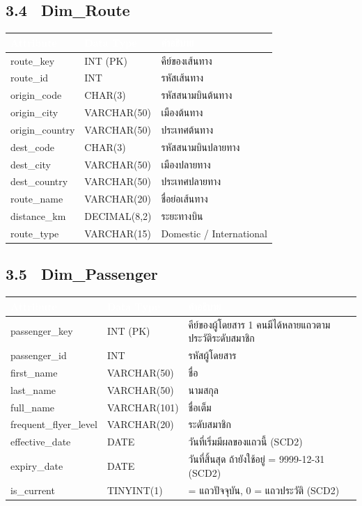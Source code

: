 \documentclass[11pt]{article}
\makeatletter
\newcommand{\atthead}{\rowcolor{tblHead}
  \textcolor{white}{\textbf{Attribute}} & \textcolor{white}{\textbf{Data Type}} & \textcolor{white}{\textbf{คำอธิบาย}}\\}
\newenvironment{atttable}[1]%
  {\subsection*{#1}\vspace{-4pt}
   \begin{tabular}{@{}>{\ttfamily\small}p{4.3cm} >{\small}p{2.7cm} >{\small\raggedright\arraybackslash}p{9.4cm}@{}}
   \toprule\atthead \midrule}%
  {\bottomrule\end{tabular}\vspace{3pt}}
\makeatother
\begin{document}
\begin{atttable}{3.4 \ Dim_Route }
route_key      & INT (PK)     & คีย์ของเส้นทาง\\
route_id       & INT          & รหัสเส้นทาง\\
origin_code    & CHAR(3)      & รหัสสนามบินต้นทาง\\
origin_city    & VARCHAR(50)  & เมืองต้นทาง\\
origin_country & VARCHAR(50)  & ประเทศต้นทาง\\
dest_code      & CHAR(3)      & รหัสสนามบินปลายทาง\\
dest_city      & VARCHAR(50)  & เมืองปลายทาง\\
dest_country   & VARCHAR(50)  & ประเทศปลายทาง\\
route_name     & VARCHAR(20)  & ชื่อย่อเส้นทาง\\
distance_km    & DECIMAL(8,2) & ระยะทางบิน \\
route_type     & VARCHAR(15)  & Domestic / International\\
\end{atttable}

\clearpage
\begin{atttable}{3.5 \ Dim_Passenger }
passenger_key        & INT (PK)     & คีย์ของผู้โดยสาร 1 คนมีได้หลายแถวตามประวัติระดับสมาชิก\\
passenger_id         & INT          & รหัสผู้โดยสาร\\
first_name           & VARCHAR(50)  & ชื่อ\\
last_name            & VARCHAR(50)  & นามสกุล\\
full_name            & VARCHAR(101) & ชื่อเต็ม\\
frequent_flyer_level & VARCHAR(20)  & ระดับสมาชิก\\
effective_date       & DATE         & วันที่เริ่มมีผลของแถวนี้ (SCD2)\\
expiry_date          & DATE         & วันที่สิ้นสุด ถ้ายังใช้อยู่ = 9999-12-31 (SCD2)\\
is_current           & TINYINT(1)   & 1 = แถวปัจจุบัน, 0 = แถวประวัติ (SCD2)\\
\end{atttable}
\end{document}
